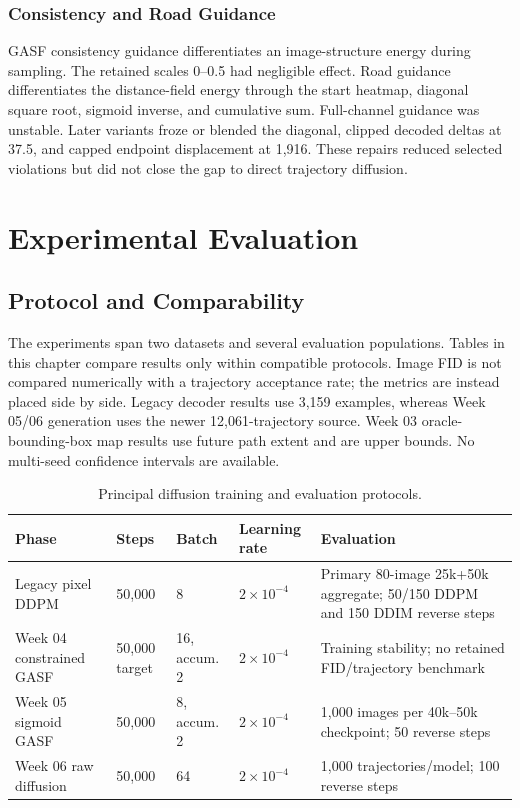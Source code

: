\documentclass[12pt,a4paper,oneside]{report}
\begin{document}
\subsection{Consistency and Road Guidance}

GASF consistency guidance differentiates an image-structure energy during sampling. The retained scales 0--0.5 had negligible effect. Road guidance differentiates the distance-field energy through the start heatmap, diagonal square root, sigmoid inverse, and cumulative sum. Full-channel guidance was unstable. Later variants froze or blended the diagonal, clipped decoded deltas at 37.5, and capped endpoint displacement at 1,916. These repairs reduced selected violations but did not close the gap to direct trajectory diffusion.

\chapter{Experimental Evaluation}
\label{chap:evaluation}

\section{Protocol and Comparability}

The experiments span two datasets and several evaluation populations. Tables in this chapter compare results only within compatible protocols. Image FID is not compared numerically with a trajectory acceptance rate; the metrics are instead placed side by side. Legacy decoder results use 3,159 examples, whereas Week 05/06 generation uses the newer 12,061-trajectory source. Week 03 oracle-bounding-box map results use future path extent and are upper bounds. No multi-seed confidence intervals are available.

\begin{table}[htbp]
\centering
\caption{Principal diffusion training and evaluation protocols.}
\label{tab:protocols}
\small
\begin{tabular}{L{0.20\textwidth}L{0.12\textwidth}L{0.12\textwidth}L{0.14\textwidth}L{0.30\textwidth}}
\toprule
Phase & Steps & Batch & Learning rate & Evaluation \\
\midrule
Legacy pixel DDPM & 50,000 & 8 & $2\times10^{-4}$ & Primary 80-image 25k+50k aggregate; 50/150 DDPM and 150 DDIM reverse steps \\
Week 04 constrained GASF & 50,000 target & 16, accum. 2 & $2\times10^{-4}$ & Training stability; no retained FID/trajectory benchmark \\
Week 05 sigmoid GASF & 50,000 & 8, accum. 2 & $2\times10^{-4}$ & 1,000 images per 40k--50k checkpoint; 50 reverse steps \\
Week 06 raw diffusion & 50,000 & 64 & $2\times10^{-4}$ & 1,000 trajectories/model; 100 reverse steps \\
\bottomrule
\end{tabular}
\end{table}
\end{document}
